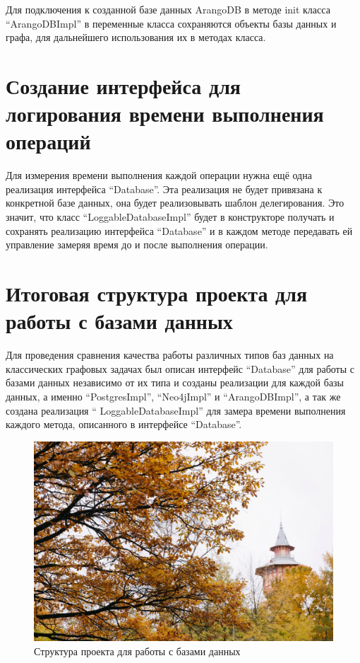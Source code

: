 Для подключения к созданной базе данных ArangoDB в методе init класса “ArangoDBImpl” в переменные класса сохраняются объекты базы данных и графа, для дальнейшего использования их в методах класса.


\section{Создание интерфейса для логирования времени выполнения операций}

Для измерения времени выполнения каждой операции нужна ещё одна реализация интерфейса “Database”. Эта реализация не будет привязана к конкретной базе данных, она будет реализовывать шаблон делегирования. Это значит, что класс “LoggableDatabaseImpl” будет в конструкторе получать и сохранять реализацию интерфейса “Database” и в каждом методе передавать ей управление замеряя время до и после выполнения операции.


\section{Итоговая структура проекта для работы с базами данных}

Для проведения сравнения качества работы различных типов баз данных на классических графовых задачах был описан интерфейс “Database” для работы с базами данных независимо от их типа и созданы реализации для каждой базы данных, а именно “PostgresImpl”, “Neo4jImpl” и “ArangoDBImpl”, а так же создана реализация “ LoggableDatabaseImpl” для замера времени выполнения каждого метода, описанного в интерфейсе “Database”.

\begin{figure}[ht!]
    \center
    \includegraphics [scale=0.27] {my_folder/images//spbpu_hydrotower}
    \caption{Структура проекта для работы с базами данных}
\end{figure}

%
